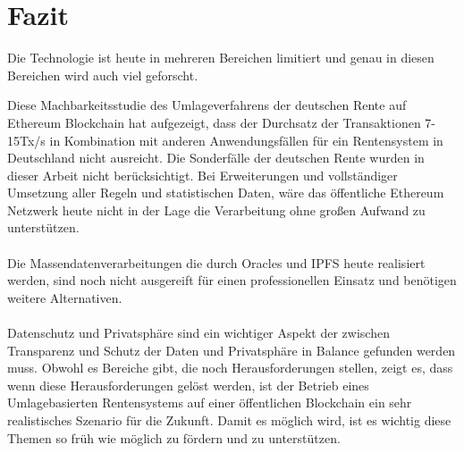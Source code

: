 \section{Fazit}
Die Technologie ist heute in mehreren Bereichen limitiert und genau in diesen Bereichen wird auch viel geforscht.

Diese Machbarkeitsstudie des Umlageverfahrens der deutschen Rente auf Ethereum Blockchain hat aufgezeigt, dass der Durchsatz der Transaktionen 7-15Tx/s in Kombination mit anderen Anwendungsfällen für ein Rentensystem in Deutschland nicht ausreicht. 
Die Sonderfälle der deutschen Rente wurden in dieser Arbeit nicht berücksichtigt. Bei Erweiterungen und vollständiger Umsetzung aller Regeln und statistischen Daten, wäre das öffentliche Ethereum Netzwerk heute nicht in der Lage die Verarbeitung ohne großen Aufwand zu unterstützen.

\paragraph*{}
Die Massendatenverarbeitungen die durch Oracles und IPFS heute realisiert werden, sind noch nicht ausgereift für einen professionellen Einsatz und benötigen weitere Alternativen.

\paragraph*{}
Datenschutz und Privatsphäre sind ein wichtiger Aspekt der zwischen Transparenz und Schutz der Daten und Privatsphäre in Balance gefunden werden muss. 
Obwohl es Bereiche gibt, die noch Herausforderungen stellen, zeigt es, dass wenn diese Herausforderungen gelöst werden, ist der Betrieb eines Umlagebasierten Rentensystems auf einer öffentlichen Blockchain ein sehr realistisches Szenario für die Zukunft. Damit es möglich wird, ist es wichtig diese Themen so früh wie möglich zu fördern und zu unterstützen.

